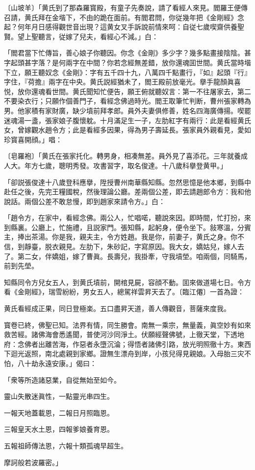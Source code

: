 \begin{myquote}[\markfont]
〔山坡羊〕{\kaishu「黄氏到了那森羅寳殿，有童子先奏說，請了看經人來見。閻羅王便傳召請，黄氏拜在金堦下，不由的跪在面前。有閻君問，你従幾年把《金剛經》念起？何年月日感得觀世音出現？這黄女叉手訴說前情來呵：自従七歲喫齋供養聖賢。望上聖聽言，従嫁了兒夫，看經心不減。」}{\small{白}}：

「閻君當下忙傳旨，善心娘子你聽因。你念《金剛》多少字？幾多點畫接陰陰。甚字起頭甚字落？是何兩字在中間？你若念經無差錯，放你還魂囬世間。黄氏當時堦下立，願王聽奴念《金剛》：字有五千四十九，八萬四千點畫行，『如』起頭『行』字住，『荷擔』兩字在中央。黄氏説經猶未了，閻王殿前放毫光。擧手龍顏眞喜悦，放你還魂看世間。黄氏聞知忙便告，願王俯就聽奴言：第一不往屠家去，第二不要染衣行；只願作個善門子，看經念佛過時光。閻王取筆忙判断，曹州張家轉為男。他家積有家財廣，缺少墳前拜孝郎。員外夫妻俱修善，姓名四海廣傳揚。喫罷迷魂湯一盞，張家娘子腹懷躭。十月滿足生一子，左肋紅字有兩行：此是看經黄氏女，曾嫁觀水趙令方；此是看經多因果，得為男子壽延長。張家員外親看見，愛如珍寳喜開顔。」{\small{唱}}：

〔皂羅袍〕{\kaishu「黄氏在張家托化。轉男身，相凑無差。員外見了喜添花。三年就養成人大。年方七歲，聰明秀發。攻書習字，取名俊達。十八歲科擧登黄甲。」}

「卻説張俊達十八歲登科應擧，陞授曹州南華縣知縣。忽然思憶是他本鄉，到縣中赴任之後，先完王糧國稅，然後理論公廳。差兩個公差，即去請趙郎令方：我和他說話。兩個公差不敢怠慢，即到趙家來請令方。」{\small{白}}：

「趙令方，在家中，看經念佛。兩公人，忙唱喏，聽說來因。即時間，忙打扮，來到縣裏。公廳上，忙施禮，且説家門。張知縣，起躬身，便令坐下。敍寒溫，分賓主，捧出茶湯。你是我，親夫主，令方姓趙。我是你，前妻子，黄氏之身。你不信，到靜臺，脱衣親見。左肋下，朱砂記，字寫原因。我大女，嬌姑兒，嫁人去了。第二女，伴嬌姐，嫁了曹眞。長壽兒，我掛牽，守我墳塋。咱兩個，同騎馬，前到先塋。

知縣同令方兒女五人，到黄氏墳前，開棺見屍，容顔不動。囬來做道場七日。令方看《金剛經》，瑞雪紛紛，男女五人，總駕祥雲昇天去了。〔臨江僊〕一首為證：

{\kaishu
黄氏看經成正果，同日登極楽。五口盡昇天道，善人傳觀音，菩薩來度我。
}

寳卷已終，佛聖已知。法界有情，同生勝會。南無一乘宗，無量義，眞空妙有如來救苦經。諸佛海會悉遙聞，普使河沙同淨土。伏願經聲佛號，上徹天堂，下透地府：念佛者出離苦海，作惡者永墮沉淪；得悟者諸佛引路，放光明照徹十方。東西下迴光返照，南北處親到家鄉。證無生漂舟到岸，小孩兒得見親娘。入母胎三灾不怕，八十劫永遠安康。」偈曰：

{\kaishu
「衆等所造諸惡業，自從無始至如今。

靈山失散迷眞性，一點靈光串四生。

一報天地蓋載恩，二報日月照臨恩。

三報皇天水土恩，四報爹娘養育恩。

五報祖師傳法恩，六報十類孤魂早超生。

摩訶般若波羅密。」
}
\end{myquote}


